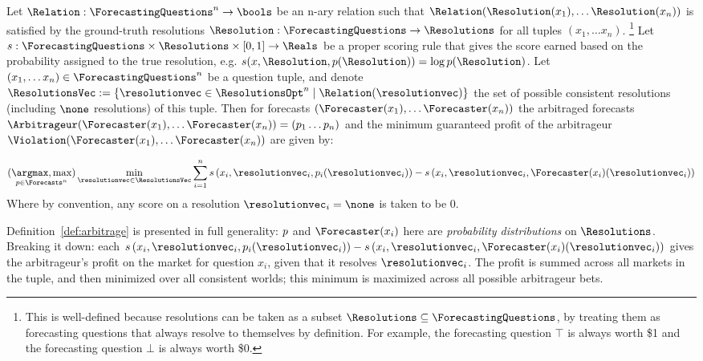 \begin{definition}
    Let $\Relation:\ForecastingQuestions^n\to\bools$ be an n-ary relation such that $\Relation(\Resolution(x_1), \dots \Resolution(x_n))$ is satisfied by the ground-truth resolutions $\Resolution:\ForecastingQuestions\to\Resolutions$ for all tuples $(x_1,\dots x_n)$. \footnote{This is well-defined because resolutions can be taken as a subset $\Resolutions\subseteq\ForecastingQuestions$, by treating them as forecasting questions that always resolve to themselves by definition. For example, the forecasting question $\top$ is always worth \$1 and the forecasting question $\bot$ is always worth \$0.} Let $s:\ForecastingQuestions\times\Resolutions\times[0,1]\to\Reals$ be a proper scoring rule that gives the score earned based on the probability assigned to the true resolution, e.g. $s(x,\Resolution,p(\Resolution))=\log p(\Resolution)$. Let $(x_1,\dots x_n)\in\ForecastingQuestions^n$ be a question tuple, and denote $\ResolutionsVec:=\{\resolutionvec\in\ResolutionsOpt^n\mid\Relation(\resolutionvec)\}$ the set of possible consistent resolutions (including $\none$ resolutions) of this tuple. Then for forecasts $(\Forecaster(x_1),\dots\Forecaster(x_n))$ the arbitraged forecasts $\Arbitrageur(\Forecaster(x_1),\dots\Forecaster(x_n))=(p_1\dots p_n)$ and the minimum guaranteed profit of the arbitrageur $\Violation(\Forecaster(x_1),\dots\Forecaster(x_n))$ are given by:

    \begin{equation}
        \argmaxmax_{\consp\in\Forecasts^n}
        \min_{\resolutionvec\in\ResolutionsVec}
        \sum_{i=1}^n
        \score{x_i, \resolutionvec_i, p_i(\resolutionvec_i)}
        - \score{x_i, \resolutionvec_i, \Forecaster(x_i)(\resolutionvec_i)}%
        \label{eq:arbitrage}
    \end{equation}
    Where by convention, any score on a resolution $\resolutionvec_i=\none$ is taken to be 0.
    \label{def:arbitrage}
\end{definition}

Definition~\ref{def:arbitrage} is presented in full generality: $p$ and $\Forecaster(x_i)$ here are \emph{probability distributions} on $\Resolutions$. Breaking it down: each $\score{x_i, \resolutionvec_i, p_i(\resolutionvec_i)}- \score{x_i, \resolutionvec_i, \Forecaster(x_i)(\resolutionvec_i)}$ gives the arbitrageur's profit on the market for question $x_i$, given that it resolves $\resolutionvec_i$. The profit is summed across all markets in the tuple, and then minimized over all consistent worlds; this minimum is maximized across all possible arbitrageur bets.

